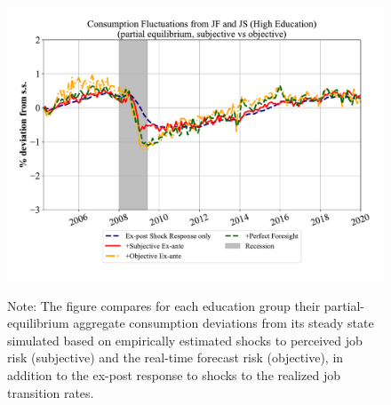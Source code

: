 \begin{figure}
\vspace{-2em}
\includegraphics[width=0.63\linewidth]{text/chapter2/Figures/consumption_pe_JS_JF_deviation_machine_as_rational_HighEdu_monthly.pdf}
      \begin{flushleft}\footnotesize {Note: The figure compares for each education group their partial-equilibrium aggregate consumption deviations from its steady state simulated based on empirically estimated shocks to perceived job risk (subjective) and the real-time forecast risk (objective), in addition to the ex-post response to shocks to the realized job transition rates.} \end{flushleft}
    \end{figure}